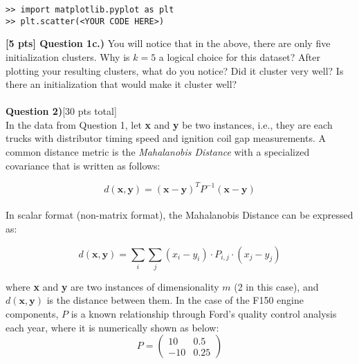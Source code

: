 \documentclass[paper=a4, fontsize=11pt]{scrartcl} %
\begin{document}
\begin{verbatim}
>> import matplotlib.pyplot as plt
>> plt.scatter(<YOUR CODE HERE>)
\end{verbatim}

\textbf{[5 pts] Question 1c.)} You will notice that in the above, there are only five initialization clusters. Why is $k=5$ a logical choice for this dataset? After plotting your resulting clusters, what do you notice? Did it cluster very well? Is there an initialization that would make it cluster well?\\
\\

{\Large \textbf{Question 2)}[30 pts total]} \\

In the data from Question 1, let \textbf{x} and \textbf{y} be two instances, i.e., they are each trucks with distributor timing speed and ignition coil gap measurements.  A common distance metric is the \emph{Mahalanobis Distance} with a specialized covariance that is written as follows: 

\begin{equation}
d(\textbf{x}, \textbf{y}) = ( \textbf{x} - \textbf{y} )^T P^{-1} ( \textbf{x} - \textbf{y} )
\end{equation} \\

In scalar format (non-matrix format), the Mahalanobis Distance can be expressed as:

\begin{equation}
    d(\textbf{x}, \textbf{y}) = \sum_i \sum_j (x_i - y_i) \cdot P_{i,j} \cdot (x_j - y_j)
\end{equation}

where \textbf{x} and \textbf{y} are two instances of dimensionality $m$ (2 in this case), and $d(\textbf{x}, \textbf{y})$ is the distance between them. In the case of the F150 engine components, $P$ is a known relationship through Ford's quality control analysis each year, where it is numerically shown as below: \\

\begin{equation}
 P = \left(
\begin{matrix}
10 & 0.5 \\
-10 & 0.25
\end{matrix}
\right)
\end{equation}
\\
\end{document}
